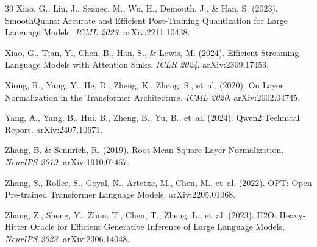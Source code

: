 \documentclass[11pt]{article}
\begin{document}
\begin{thebibliography}{30}
Xiao, G., Lin, J., Seznec, M., Wu, H., Demouth, J., \& Han, S. (2023).
\newblock SmoothQuant: Accurate and Efficient Post-Training Quantization for Large Language Models.
\newblock \emph{ICML 2023}. arXiv:2211.10438.

Xiao, G., Tian, Y., Chen, B., Han, S., \& Lewis, M. (2024).
\newblock Efficient Streaming Language Models with Attention Sinks.
\newblock \emph{ICLR 2024}. arXiv:2309.17453.

Xiong, R., Yang, Y., He, D., Zheng, K., Zheng, S., et~al. (2020).
\newblock On Layer Normalization in the Transformer Architecture.
\newblock \emph{ICML 2020}. arXiv:2002.04745.

Yang, A., Yang, B., Hui, B., Zheng, B., Yu, B., et~al. (2024).
\newblock Qwen2 Technical Report.
\newblock arXiv:2407.10671.

Zhang, B. \& Sennrich, R. (2019).
\newblock Root Mean Square Layer Normalization.
\newblock \emph{NeurIPS 2019}. arXiv:1910.07467.

Zhang, S., Roller, S., Goyal, N., Artetxe, M., Chen, M., et~al. (2022).
\newblock OPT: Open Pre-trained Transformer Language Models.
\newblock arXiv:2205.01068.

Zhang, Z., Sheng, Y., Zhou, T., Chen, T., Zheng, L., et~al. (2023).
\newblock H2O: Heavy-Hitter Oracle for Efficient Generative Inference of Large Language Models.
\newblock \emph{NeurIPS 2023}. arXiv:2306.14048.

\end{thebibliography}
\end{document}
